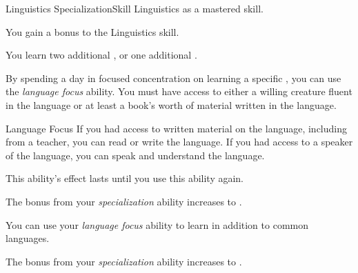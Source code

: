     \begin{feat}{Linguistics Specialization}{Skill}
        \featpre Linguistics as a mastered skill.

         You gain a  bonus to the Linguistics skill.

         You learn two additional , or one additional .

         By spending a day in focused concentration on learning a specific , you can use the \textit{language focus} ability.
        You must have access to either a willing creature fluent in the language or at least a book's worth of material written in the language.
        \begin{freeability}{Language Focus}
            If you had access to written material on the language, including from a teacher, you can read or write the language.
            If you had access to a speaker of the language, you can speak and understand the language.

            This ability's effect lasts until you use this ability again.
        \end{freeability}

         The bonus from your \textit{specialization} ability increases to .

         You can use your \textit{language focus} ability to learn  in addition to common languages.

         The bonus from your \textit{specialization} ability increases to .
    \end{feat}

